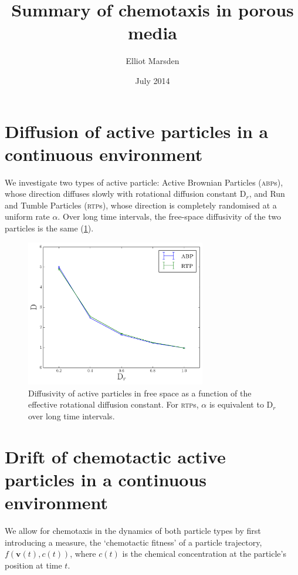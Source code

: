 \documentclass[a4wide,11pt]{article}
\begin{document}
\title{Summary of chemotaxis in porous media}
\author{Elliot Marsden}
\date{July 2014}
\maketitle

\tableofcontents
\newpage

\section{Diffusion of active particles in a continuous environment}

We investigate two types of active particle: Active Brownian Particles (\textsc{abp}s), whose direction diffuses slowly with rotational diffusion constant $\mathrm{D}_r$, and Run and Tumble Particles (\textsc{rtp}s), whose direction is completely randomised at a uniform rate $\alpha$. Over long time intervals, the free-space diffusivity of the two particles is the same (\cref{free_D}).

\begin{figure}
    \centering
    \includegraphics[width=0.7\textwidth]{img/free_space_D_of_Dr.pdf}
    \caption{Diffusivity of active particles in free space as a function of the effective rotational diffusion constant. For \textsc{rtp}s, $\alpha$ is equivalent to $\mathrm{D}_r$ over long time intervals.}
    \label{free_D}
\end{figure}

\section{Drift of chemotactic active particles in a continuous environment}

We allow for chemotaxis in the dynamics of both particle types by first introducing a measure, the `chemotactic fitness' of a particle trajectory, $f(\mathbf{v}(t), c(t))$, where $c(t)$ is the chemical concentration at the particle's position at time $t$.
\end{document}
